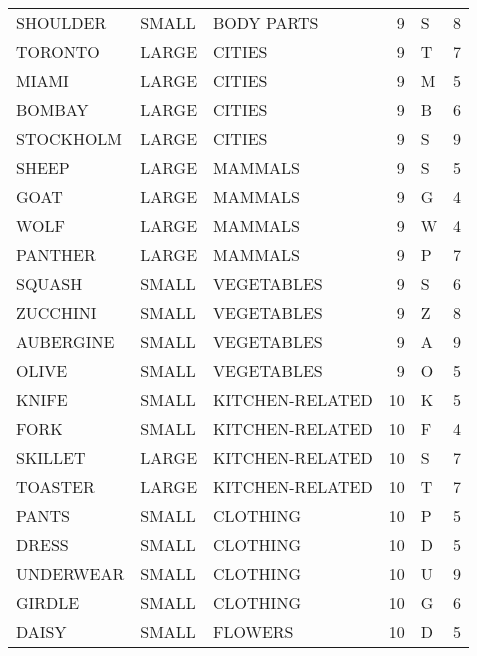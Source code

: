 \begin{tabular}{lllrlr}
    SHOULDER & SMALL &       BODY PARTS &        9 &            S &       8 \\
     TORONTO & LARGE &           CITIES &        9 &            T &       7 \\
       MIAMI & LARGE &           CITIES &        9 &            M &       5 \\
      BOMBAY & LARGE &           CITIES &        9 &            B &       6 \\
   STOCKHOLM & LARGE &           CITIES &        9 &            S &       9 \\
       SHEEP & LARGE &          MAMMALS &        9 &            S &       5 \\
        GOAT & LARGE &          MAMMALS &        9 &            G &       4 \\
        WOLF & LARGE &          MAMMALS &        9 &            W &       4 \\
     PANTHER & LARGE &          MAMMALS &        9 &            P &       7 \\
      SQUASH & SMALL &       VEGETABLES &        9 &            S &       6 \\
    ZUCCHINI & SMALL &       VEGETABLES &        9 &            Z &       8 \\
   AUBERGINE & SMALL &       VEGETABLES &        9 &            A &       9 \\
       OLIVE & SMALL &       VEGETABLES &        9 &            O &       5 \\
       KNIFE & SMALL &  KITCHEN-RELATED &       10 &            K &       5 \\
        FORK & SMALL &  KITCHEN-RELATED &       10 &            F &       4 \\
     SKILLET & LARGE &  KITCHEN-RELATED &       10 &            S &       7 \\
     TOASTER & LARGE &  KITCHEN-RELATED &       10 &            T &       7 \\
       PANTS & SMALL &         CLOTHING &       10 &            P &       5 \\
       DRESS & SMALL &         CLOTHING &       10 &            D &       5 \\
   UNDERWEAR & SMALL &         CLOTHING &       10 &            U &       9 \\
      GIRDLE & SMALL &         CLOTHING &       10 &            G &       6 \\
       DAISY & SMALL &          FLOWERS &       10 &            D &       5 \\

\end{tabular}

